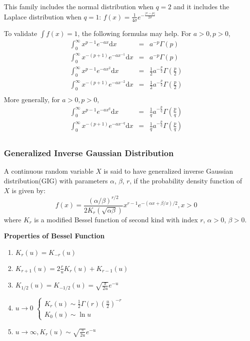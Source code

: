 \documentclass[11pt]{article}
\begin{document}
This family includes the normal distribution when $q=2$ and it includes the Laplace distribution when $q=1$: $f(x)=\frac{1}{4\sigma} e^{-\frac{|x-\mu|}{2\sigma}}$

To validate $\int{f(x)}=1$, the following formulas may help. For $a>0, p>0$,
\begin{eqnarray*}
\int_{0}^{\infty}x^{p-1}e^{-ax}\mathrm dx &=& a^{-p}\Gamma(p) \\
\int_{0}^{\infty}x^{-(p+1)}e^{-ax^{-1}}\mathrm dx &=& a^{-p}\Gamma(p) \\
\int_{0}^{\infty}x^{p-1}e^{-ax^2}\mathrm dx &=& \frac{1}{2}a^{-\frac{p}{2}}\Gamma(\frac{p}{2}) \\
\int_{0}^{\infty}x^{-(p+1)}e^{-ax^{-2}}\mathrm dx &=& \frac{1}{2}a^{-\frac{p}{2}}\Gamma(\frac{p}{2}) \\
\end{eqnarray*}
More generally, for $a>0, p>0$,
\begin{eqnarray*}
\int_{0}^{\infty}x^{p-1}e^{-ax^q}\mathrm dx &=& \frac{1}{q}a^{-\frac{p}{q}}\Gamma(\frac{p}{q}) \\
\int_{0}^{\infty}x^{-(p+1)}e^{-ax^{-q}}\mathrm dx &=& \frac{1}{q}a^{-\frac{p}{q}}\Gamma(\frac{p}{q}) \\
\end{eqnarray*}
\subsubsection{Generalized Inverse Gaussian Distribution}
A continuous random variable $X$ is said to have generalized inverse Gaussian distribution(GIG) with parameters $\alpha$, $\beta$, $r$, if the probability density function of $X$ is given by:
\[f(x) = \frac{(\alpha / \beta)^{r/2}}{2 K_r(\sqrt{\alpha\beta})} x^{r-1} e^{-(\alpha x + \beta/x)/2}, x > 0\]
where $K_r$ is a modified Bessel function of second kind with index $r$, $\alpha > 0$, $\beta > 0$.

\textbf{Properties of Bessel Function}
\begin{enumerate}[(1)]
\item
$K_r(u)=K_{-r}(u)$
\item
$K_{r+1}(u)=2\frac{r}{u}K_{r}(u)+K_{r-1}(u)$
\item
$K_{1/2}(u)=K_{-1/2}(u)=\sqrt{\frac{\pi}{2u}}e^{-u}$
\item
$u\rightarrow0 \,\, \begin{cases}
  K_r(u) \sim \frac{1}{2}\Gamma(r)\left(\frac{u}{2}\right)^{-r} \\
  K_0(u) \sim \ln{u}
  \end{cases}$
\item
$u\rightarrow\infty, K_r(u)\sim\sqrt{\frac{\pi}{2u}}e^{-u}$
\end{enumerate}
\end{document}
